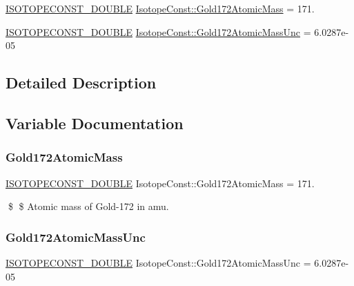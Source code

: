 \begin{DoxyCompactItemize}
\item 
\mbox{\hyperlink{group___isotope_const-_macros_ga8f45a7272ce02c0b4c65c44636ed719a}{I\+S\+O\+T\+O\+P\+E\+C\+O\+N\+S\+T\+\_\+\+D\+O\+U\+B\+LE}} \mbox{\hyperlink{group___isotope_const-_gold-_au172_ga731289504b8cef6c4e79ab90078bd191}{Isotope\+Const\+::\+Gold172\+Atomic\+Mass}} = 171.
\item 
\mbox{\hyperlink{group___isotope_const-_macros_ga8f45a7272ce02c0b4c65c44636ed719a}{I\+S\+O\+T\+O\+P\+E\+C\+O\+N\+S\+T\+\_\+\+D\+O\+U\+B\+LE}} \mbox{\hyperlink{group___isotope_const-_gold-_au172_ga53974079086ab6cdb795a0359ee8b1f7}{Isotope\+Const\+::\+Gold172\+Atomic\+Mass\+Unc}} = 6.\+0287e-\/05
\end{DoxyCompactItemize}


\subsection{Detailed Description}


\subsection{Variable Documentation}
\mbox{\label{group___isotope_const-_gold-_au172_ga731289504b8cef6c4e79ab90078bd191}} 
\subsubsection{\texorpdfstring{Gold172\+Atomic\+Mass}{Gold172AtomicMass}}
{\footnotesize\ttfamily \mbox{\hyperlink{group___isotope_const-_macros_ga8f45a7272ce02c0b4c65c44636ed719a}{I\+S\+O\+T\+O\+P\+E\+C\+O\+N\+S\+T\+\_\+\+D\+O\+U\+B\+LE}} Isotope\+Const\+::\+Gold172\+Atomic\+Mass = 171.}

\$ \$ Atomic mass of Gold-\/172 in amu. \mbox{\label{group___isotope_const-_gold-_au172_ga53974079086ab6cdb795a0359ee8b1f7}} 
\subsubsection{\texorpdfstring{Gold172\+Atomic\+Mass\+Unc}{Gold172AtomicMassUnc}}
{\footnotesize\ttfamily \mbox{\hyperlink{group___isotope_const-_macros_ga8f45a7272ce02c0b4c65c44636ed719a}{I\+S\+O\+T\+O\+P\+E\+C\+O\+N\+S\+T\+\_\+\+D\+O\+U\+B\+LE}} Isotope\+Const\+::\+Gold172\+Atomic\+Mass\+Unc = 6.\+0287e-\/05}

